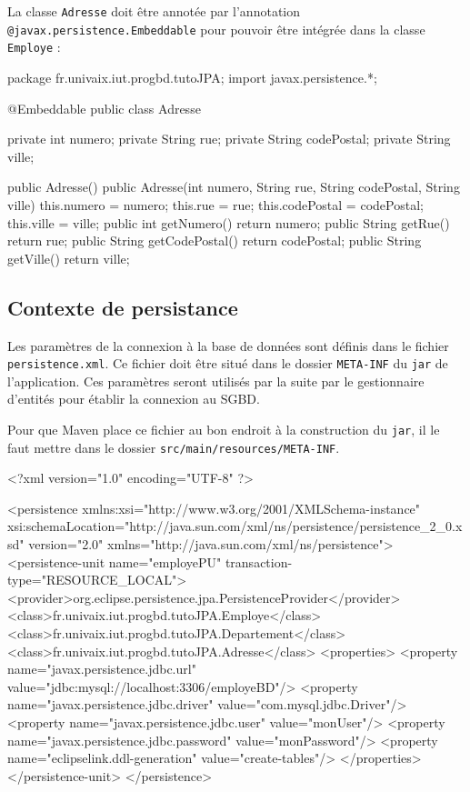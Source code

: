 \documentclass[a4paper,11pt]{article}
\begin{document}
La classe \texttt{Adresse} doit être annotée par l'annotation \texttt{@javax.persistence.Embeddable} pour pouvoir être 
intégrée dans la classe \texttt{Employe} :
\begin{code_java}
package fr.univaix.iut.progbd.tutoJPA;
import javax.persistence.*;

@Embeddable
public class Adresse {
	private int numero;
	private String rue;
	private String codePostal;
	private String ville;
		
	public Adresse() {}
	public Adresse(int numero, String rue, String codePostal, String ville) {
		this.numero = numero;
		this.rue = rue;
		this.codePostal = codePostal;
		this.ville = ville;
	}
	public int getNumero() { return numero; }
	public String getRue() { return rue; }
	public String getCodePostal() { return codePostal; }
	public String getVille() { return ville; }
}
\end{code_java}
\subsection{Contexte de persistance}
Les paramètres de la connexion à la base de données sont définis dans le fichier \texttt{persistence.xml}. Ce fichier 
doit être situé dans le dossier \texttt{META-INF} du \texttt{jar} de l’application. Ces paramètres seront utilisés par 
la suite par le gestionnaire d'entités pour établir la connexion au SGBD.

Pour que Maven place ce fichier au bon endroit à la construction du \texttt{jar}, il le faut mettre dans le dossier 
\texttt{src/main/resources/META-INF}.

\begin{code_xml}
<?xml version="1.0" encoding="UTF-8" ?>

<persistence xmlns:xsi="http://www.w3.org/2001/XMLSchema-instance" 
 xsi:schemaLocation="http://java.sun.com/xml/ns/persistence/persistence_2_0.xsd" 
 version="2.0" xmlns="http://java.sun.com/xml/ns/persistence">
  <persistence-unit name="employePU" transaction-type="RESOURCE_LOCAL">
    <provider>org.eclipse.persistence.jpa.PersistenceProvider</provider>
    <class>fr.univaix.iut.progbd.tutoJPA.Employe</class>
    <class>fr.univaix.iut.progbd.tutoJPA.Departement</class>
    <class>fr.univaix.iut.progbd.tutoJPA.Adresse</class>
    <properties>
      <property name="javax.persistence.jdbc.url" 
                value="jdbc:mysql://localhost:3306/employeBD"/>
      <property name="javax.persistence.jdbc.driver" 
                value="com.mysql.jdbc.Driver"/>
      <property name="javax.persistence.jdbc.user"  value="monUser"/>
      <property name="javax.persistence.jdbc.password"  value="monPassword"/>
      <property name="eclipselink.ddl-generation"  value="create-tables"/>
    </properties>
  </persistence-unit>
</persistence>
\end{code_xml}
\end{document}
